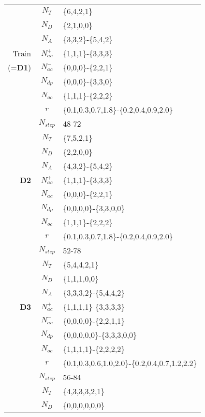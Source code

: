 \documentclass{article} \usepackage{iclr2020_conference,times}
\newcommand{\tb}{\textbf}
\begin{document}
\begin{table*}[!hbt] 
\centering
\begin{tabular}{r|c|l}
  \hline
      & $N_T$       & \{6,4,2,1\}\\ 
      & $N_D$       & \{2,1,0,0\}\\
      & $N_A$       & \{3,3,2\}-\{5,4,2\}\\
Train & $N_{ac}^{+}$& \{1,1,1\}-\{3,3,3\}\\ 
(=\tb{D1})& $N_{ac}^{-}$& \{0,0,0\}-\{2,2,1\}\\
      & $N_{dp}$    &\{0,0,0\}-\{3,3,0\}\\
      & $N_{oc}$    &\{1,1,1\}-\{2,2,2\}\\
      & $r$       &\{0.1,0.3,0.7,1.8\}-\{0.2,0.4,0.9,2.0\}\\
      & $N_{step}$  &48-72\\
  \hline
      & $N_T$       & \{7,5,2,1\}\\ 
      & $N_D$       & \{2,2,0,0\}\\
      & $N_A$       & \{4,3,2\}-\{5,4,2\}\\
\tb{D2}& $N_{ac}^{+}$& \{1,1,1\}-\{3,3,3\}\\ 
      & $N_{ac}^{-}$& \{0,0,0\}-\{2,2,1\}\\
      & $N_{dp}$      &\{0,0,0,0\}-\{3,3,0,0\}\\
      & $N_{oc}$      &\{1,1,1\}-\{2,2,2\}\\
      & $r$       &\{0.1,0.3,0.7,1.8\}-\{0.2,0.4,0.9,2.0\}\\
      & $N_{step}$  &52-78\\
  \hline
      & $N_T$       & \{5,4,4,2,1\}\\ 
      & $N_D$       & \{1,1,1,0,0\}\\
      & $N_A$       & \{3,3,3,2\}-\{5,4,4,2\}\\
\tb{D3}& $N_{ac}^{+}$& \{1,1,1,1\}-\{3,3,3,3\}\\ 
      & $N_{ac}^{-}$& \{0,0,0,0\}-\{2,2,1,1\}\\
      & $N_{dp}$      &\{0,0,0,0,0\}-\{3,3,3,0,0\}\\
      & $N_{oc}$      &\{1,1,1,1\}-\{2,2,2,2\}\\
      & $r$       &\{0.1,0.3,0.6,1.0,2.0\}-\{0.2,0.4,0.7,1.2,2.2\}\\
      & $N_{step}$  &56-84\\
  \hline
      & $N_T$       & \{4,3,3,3,2,1\}\\ 
      & $N_D$       & \{0,0,0,0,0,0\}\\

\end{tabular}
\end{table*}
\end{document}
